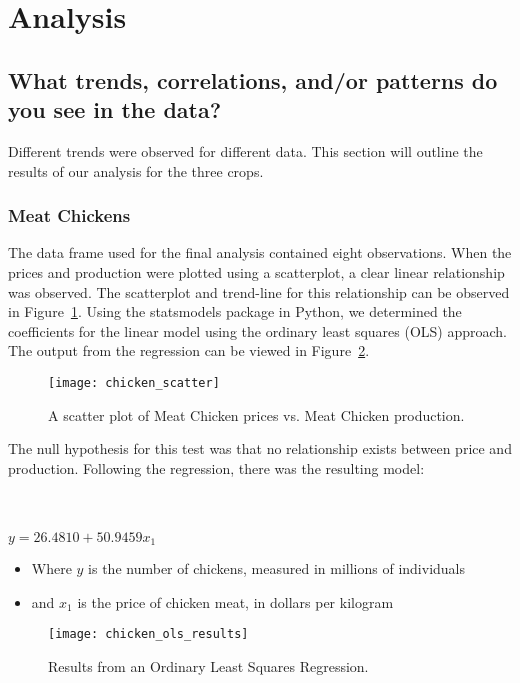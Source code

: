 \section{Analysis}

\subsection{What trends, correlations, and/or patterns do you see in the data?}

Different trends were observed for different data. This section will outline the results of our analysis for the three crops.

\subsubsection{Meat Chickens}

The data frame used for the final analysis contained eight observations.
When the prices and production were plotted using a scatterplot, a clear linear relationship was observed.
The scatterplot and trend-line for this relationship can be observed in Figure~\ref{fig:chicken_scatter}.
Using the statsmodels package in Python, we determined the coefficients for the linear model using the ordinary least squares (OLS) approach.
The output from the regression can be viewed in Figure~\ref{fig:chicken_ols}.

\begin{figure}
    \texttt{[image: chicken\_scatter]}
    \caption{A scatter plot of Meat Chicken prices vs. Meat Chicken production.}
    \label{fig:chicken_scatter}
\end{figure}

The null hypothesis for this test was that no relationship exists between price and production.
Following the regression, there was the resulting model:

\\~\\

\tabto{5cm} $y = 26.4810 + 50.9459x_1$


\begin{itemize}
    \item Where $y$ is the number of chickens, measured in millions of individuals
    \item and $x_1$ is the price of chicken meat, in dollars per kilogram
\end{itemize}

\begin{figure}
    \texttt{[image: chicken\_ols\_results]}
    \caption{Results from an Ordinary Least Squares Regression.}
    \label{fig:chicken_ols}
\end{figure}

